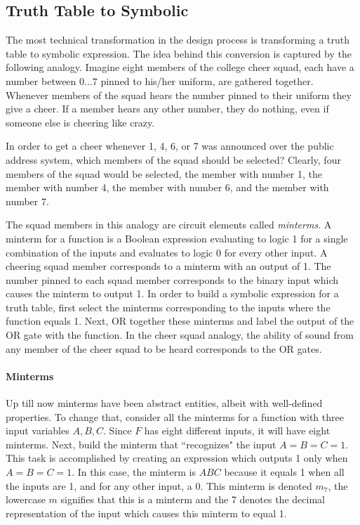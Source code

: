 \subsection{Truth Table to Symbolic}
\label{sec:TTtoSymb}

The most technical transformation in the design process is transforming 
a truth table to symbolic expression.  The idea behind this conversion is 
captured by the following analogy.  Imagine eight members of the college 
cheer squad, each have a number between $0 \ldots 7$ pinned to his/her
uniform, are gathered together.  Whenever members of the squad hears
the number pinned to their uniform they give a cheer.  If a member hears
any other number, they do nothing, even if someone else is cheering like crazy.

In order to get a cheer whenever 1, 4, 6, or 7 was announced 
over the public address system, which members of the squad should be
selected?  Clearly, four members of the squad would be selected, the member
with number 1, the member with number 4, the member with number 6,
and the member with number 7.

The squad members in this analogy are circuit elements called 
\textit{minterms}.  A minterm for a function 
is a Boolean expression evaluating to logic 1 for a single 
combination of the inputs and evaluates to logic 0 for every 
other input.  A cheering squad member corresponds to a minterm with 
an output of 1.  The number pinned to each squad member corresponds
to the binary input which causes the minterm to output 1.  In order 
to build a symbolic expression for a truth table, first select the
minterms corresponding to the inputs where the function equals 1.  
Next, OR together these minterms and label the output of
the OR gate with the function.  In the cheer squad analogy, the ability of
sound from any member of the cheer squad to be heard corresponds
to the OR gates.  

\paragraph{Minterms}
Up till now minterms have been abstract entities, albeit with
well-defined properties.  To change that, consider all
the minterms for a function  with three input variables 
$A,B,C$.  Since $F$ has eight different inputs, it will have eight 
minterms.  Next, build the minterm that ``recognizes" the input $A=B=C=1$.  
This task is accomplished by creating an expression which outputs 1 only when 
$A=B=C=1$.  In this case, the minterm is $ABC$ because it equals 
1 when all the inputs are 1, and for any other input, a 0.
This minterm is denoted $m_7$, the lowercase $m$ signifies that 
this is a minterm and the 7 denotes the decimal representation 
of the input which causes this minterm to equal 1.  

